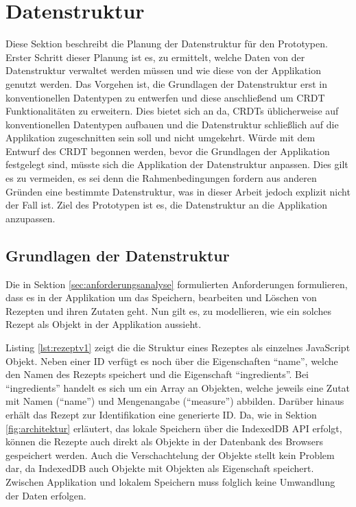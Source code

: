 \documentclass[a4paper, 12pt]{scrreprt}
\begin{document}
\section{Datenstruktur}
\label{sec:Datenstruktur}

Diese Sektion beschreibt die Planung der Datenstruktur für den Prototypen. Erster Schritt dieser Planung ist es, zu ermittelt, welche Daten von der Datenstruktur verwaltet werden müssen und wie diese von der Applikation genutzt werden. Das Vorgehen ist, die Grundlagen der Datenstruktur erst in konventionellen Datentypen zu entwerfen und diese anschließend um CRDT Funktionalitäten zu erweitern. Dies bietet sich an da, CRDTs üblicherweise auf konventionellen Datentypen aufbauen und die Datenstruktur schließlich auf die Applikation zugeschnitten sein soll und nicht umgekehrt. Würde mit dem Entwurf des CRDT begonnen werden, bevor die Grundlagen der Applikation festgelegt sind, müsste sich die Applikation der Datenstruktur anpassen. Dies gilt es zu vermeiden, es sei denn die Rahmenbedingungen fordern aus anderen Gründen eine bestimmte Datenstruktur, was in dieser Arbeit jedoch explizit nicht der Fall ist. Ziel des Prototypen ist es, die Datenstruktur an die Applikation anzupassen. 

\subsection{Grundlagen der Datenstruktur}

Die in Sektion \ref{sec:anforderungsanalyse} formulierten Anforderungen formulieren, dass es in der Applikation um das Speichern, bearbeiten und Löschen von Rezepten und ihren Zutaten geht. Nun gilt es, zu modellieren, wie ein solches Rezept als Objekt in der Applikation aussieht. 

Listing \ref{lst:rezeptv1} zeigt die die Struktur eines Rezeptes als einzelnes JavaScript Objekt. Neben einer ID verfügt es noch über die Eigenschaften \enquote{name}, welche den Namen des Rezepts speichert und die Eigenschaft \enquote{ingredients}. Bei \enquote{ingredients} handelt es sich um ein Array an Objekten, welche jeweils eine Zutat mit Namen (\enquote{name}) und Mengenangabe (\enquote{measure}) abbilden. Darüber hinaus erhält das Rezept zur Identifikation eine generierte ID. Da, wie in Sektion \ref{fig:architektur} erläutert, das lokale Speichern über die IndexedDB API erfolgt, können die Rezepte auch direkt als Objekte in der Datenbank des Browsers gespeichert werden. Auch die Verschachtelung der Objekte stellt kein Problem dar, da IndexedDB auch Objekte mit Objekten als Eigenschaft speichert. Zwischen Applikation und lokalem Speichern muss folglich keine Umwandlung der Daten erfolgen.
\end{document}

